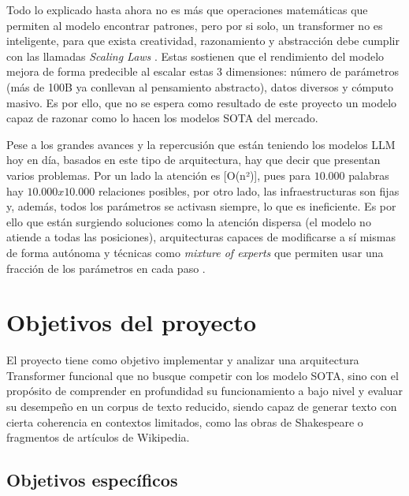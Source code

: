 \documentclass[11pt]{book}
\newcommand{\clearemptydoublepage}{\newpage{\pagestyle{empty}\cleardoublepage}}
\begin{document}
Todo lo explicado hasta ahora no es más que operaciones matemáticas que permiten al modelo encontrar patrones, pero por si solo, un transformer no es inteligente, para que exista creatividad, razonamiento y abstracción debe cumplir con las llamadas \textit{Scaling Laws} \parencite{wolfe_llm_scaling}. Estas sostienen que el rendimiento del modelo mejora de forma predecible al escalar estas 3 dimensiones: número de parámetros (más de 100B ya conllevan al pensamiento abstracto), datos diversos y cómputo masivo. Es por ello, que no se espera como resultado de este proyecto un modelo capaz de razonar como lo hacen los modelos SOTA del mercado.

Pese a los grandes avances y la repercusión que están teniendo los modelos LLM hoy en día, basados en este tipo de arquitectura, hay que decir que presentan varios problemas. Por un lado la atención es [O(n²)], pues para $10.000$ palabras hay $10.000 x 10.000$ relaciones posibles, por otro lado, las infraestructuras son fijas y, además, todos los parámetros se activasn siempre, lo que es ineficiente. Es por ello que están surgiendo soluciones como la atención dispersa (el modelo no atiende a todas las posiciones), arquitecturas capaces de modificarse a sí mismas de forma autónoma y técnicas como \textit{mixture of experts} que permiten usar una fracción de los parámetros en cada paso \parencite{plainenglish2021gpt}.


\clearemptydoublepage

\chapter{Objetivos del proyecto}

El proyecto tiene como objetivo implementar y analizar una arquitectura Transformer funcional que no busque competir con los modelo SOTA, sino con el propósito de comprender en profundidad su funcionamiento a bajo nivel y evaluar su desempeño en un corpus de texto reducido, siendo capaz de generar texto con cierta coherencia en contextos limitados, como las obras de Shakespeare o fragmentos de artículos de Wikipedia.

\section{Objetivos específicos}
\end{document}
